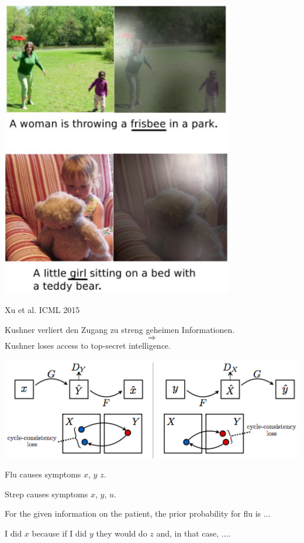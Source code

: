 {

\centerline{\includegraphics[width = 4in]{../images/AttentionInCaptioning1}}
\centerline{Xu et al. ICML 2015}


Kushner verliert den Zugang zu streng geheimen Informationen.
$$\Rightarrow$$
Kushner loses access to top-secret intelligence.

\vfill
\centerline{\includegraphics[width = 6.0in]{../images/Cycle2}}


Flu causes symptoms $x$, $y$ $z$.

\vfill
Strep causes symptoms $x$, $y$, $u$.

\vfill
For the given information on the patient, the prior probability for flu is $\ldots$


I did $x$ because if I did $y$ they would do $z$ and, in that case, $\ldots$.










}

